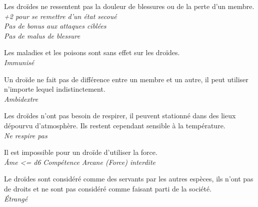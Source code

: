 \begin{description}[align=left]
\item [Créature artificielle] 	%
		Les droïdes ne ressentent pas la douleur de blessures ou de la perte d’un membre.\\
		\textit{+2 pour se remettre d’un état secoué}\\
		\textit{Pas de bonus aux attaques ciblées}\\
		\textit{Pas de malus de blessure}

\item [Immunisé] 				%
		Les maladies et les poisons sont sans effet sur les droïdes.\\
		\textit{Immunisé}

\item [Ambidextre] 				%
		Un droïde ne fait pas de différence entre un membre et un autre, il peut utiliser n’importe lequel indistinctement.\\
		\textit{Ambidextre}

\item [Manque pas d’air] 		%
		Les droïdes n’ont pas besoin de respirer, il peuvent stationné dans des lieux dépourvu d’atmosphère. Ils restent cependant sensible à la température.\\
		\textit{Ne respire pas}

\item [Pas d’\^Ame] 			%
		Il est impossible pour un droïde d’utiliser la force.\\
		\textit{\^Ame <= d6}
		\textit{Compétence Arcane (Force) interdite}

\item [Outsider] 				%
		Le droïdes sont considéré comme des servants par les autres espèces, ils n’ont pas de droits et ne sont pas considéré comme faisant parti de la société.\\
		\textit{\'Etrangé}
\end{description}